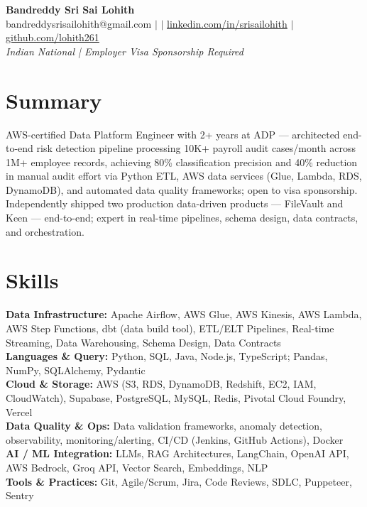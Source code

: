 \documentclass[10pt,letterpaper]{article}
\newcommand{\skillrow}[2]{\textbf{#1:} #2 \\[1pt]}
\begin{document}
\begin{center}
  {\Huge\bfseries Bandreddy Sri Sai Lohith}\\[3pt]
  \small bandreddysrisailohith@gmail.com $\vert$ $\vert$\; \href{https://linkedin.com/in/srisailohith}{linkedin.com/in/srisailohith} $\vert$\; \href{https://github.com/lohith261}{github.com/lohith261} \\[2pt]
  \small\textit{Indian National | Employer Visa Sponsorship Required}
\end{center}

\section{Summary}

AWS-certified Data Platform Engineer with 2+ years at ADP --- architected end-to-end risk detection pipeline processing 10K+ payroll audit cases/month across 1M+ employee records, achieving 80\% classification precision and 40\% reduction in manual audit effort via Python ETL, AWS data services (Glue, Lambda, RDS, DynamoDB), and automated data quality frameworks; open to visa sponsorship.
      Independently shipped two production data-driven products --- FileVault and Keen --- end-to-end; expert in real-time pipelines, schema design, data contracts, and orchestration.

\section{Skills}

\skillrow{Data Infrastructure}{Apache Airflow, AWS Glue, AWS Kinesis, AWS Lambda, AWS Step Functions, dbt (data build tool), ETL/ELT Pipelines, Real-time Streaming, Data Warehousing, Schema Design, Data Contracts}
\skillrow{Languages \& Query}{Python, SQL, Java, Node.js, TypeScript; Pandas, NumPy, SQLAlchemy, Pydantic}
\skillrow{Cloud \& Storage}{AWS (S3, RDS, DynamoDB, Redshift, EC2, IAM, CloudWatch), Supabase, PostgreSQL, MySQL, Redis, Pivotal Cloud Foundry, Vercel}
\skillrow{Data Quality \& Ops}{Data validation frameworks, anomaly detection, observability, monitoring/alerting, CI/CD (Jenkins, GitHub Actions), Docker}
\skillrow{AI / ML Integration}{LLMs, RAG Architectures, LangChain, OpenAI API, AWS Bedrock, Groq API, Vector Search, Embeddings, NLP}
\skillrow{Tools \& Practices}{Git, Agile/Scrum, Jira, Code Reviews, SDLC, Puppeteer, Sentry}
\end{document}
